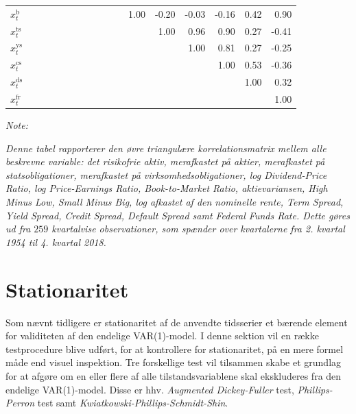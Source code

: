 \documentclass[
  a4paper,
  oneside]{memoir}
\begin{document}
\begin{landscape}
\begin{table}[!h]
\begin{threeparttable}
\begin{tabular}[t]{lrrrrrrrrrrrrrrrr}
\rowcolor{gray!6}  $x_t^{\text{b}}$ &  &  &  &  &  &  &  &  &  &  & 1.00 & -0.20 & -0.03 & -0.16 & 0.42 & 0.90\\
$x_t^{\text{ts}}$ &  &  &  &  &  &  &  &  &  &  &  & 1.00 & 0.96 & 0.90 & 0.27 & -0.41\\
\rowcolor{gray!6}  $x_t^{\text{ys}}$ &  &  &  &  &  &  &  &  &  &  &  &  & 1.00 & 0.81 & 0.27 & -0.25\\
$x_t^{\text{cs}}$ &  &  &  &  &  &  &  &  &  &  &  &  &  & 1.00 & 0.53 & -0.36\\
\rowcolor{gray!6}  $x_t^{\text{ds}}$ &  &  &  &  &  &  &  &  &  &  &  &  &  &  & 1.00 & 0.32\\
$x_t^{\text{fr}}$ &  &  &  &  &  &  &  &  &  &  &  &  &  &  &  & 1.00\\
\bottomrule
\end{tabular}
\begin{tablenotes}
\item \textit{Note: } 
\item \textit{Denne tabel rapporterer den øvre triangulære korrelationsmatrix mellem alle beskrevne variable: det risikofrie aktiv, merafkastet på aktier, merafkastet på statsobligationer, merafkastet på virksomhedsobligationer, log Dividend-Price Ratio, log Price-Earnings Ratio, Book-to-Market Ratio, aktievariansen, High Minus Low, Small Minus Big, log afkastet af den nominelle rente, Term Spread, Yield Spread, Credit Spread, Default Spread samt Federal Funds Rate. Dette gøres ud fra $259$ kvartalvise observationer, som spænder over kvartalerne fra 2. kvartal 1954 til 4. kvartal 2018.}
\end{tablenotes}
\end{threeparttable}
\end{table}
\end{landscape}

\hypertarget{stationaritet}{%
\section{Stationaritet}\label{stationaritet}}

Som nævnt tidligere er stationaritet af de anvendte tidsserier et bærende element for validiteten af den endelige VAR(1)-model. I denne sektion vil en række testprocedure blive udført, for at kontrollere for stationaritet, på en mere formel måde end visuel inspektion. Tre forskellige test vil tilsammen skabe et grundlag for at afgøre om en eller flere af alle tilstandsvariablene skal ekskluderes fra den endelige VAR(1)-model. Disse er hhv. \emph{Augmented Dickey-Fuller} test, \emph{Phillips-Perron} test samt \emph{Kwiatkowski-Phillips-Schmidt-Shin}.
\end{document}
